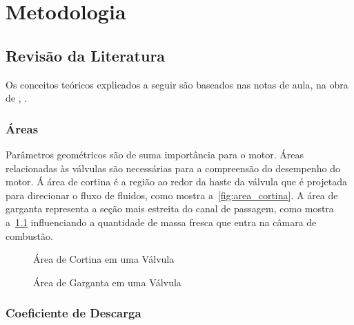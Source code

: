 \chapter{Metodologia}

\section{Revisão da Literatura}

Os conceitos teóricos explicados a seguir são baseados nas notas de aula, na obra de \textcite{heywood2018internal}, \textcite{ferguson2015internal}.

\subsection{Áreas}

Parâmetros geométricos são de suma importância para o motor. 
Áreas relacionadas às válvulas são necessárias para a compreensão do desempenho do motor.
Á área de cortina é a região ao redor da haste da válvula que é projetada para direcionar o fluxo de fluidos, como mostra a~\cref{fig:area_cortina}.
A área de garganta representa a seção mais estreita do canal de passagem, como mostra a~\cref{fig:area_garganta} influenciando a quantidade de massa fresca que entra na câmara de combustão.


\begin{figure}[!htb]
    \centering
     \begin{minipage}{0.49\textwidth}
        \centering
        \caption{Área de Cortina em uma Válvula}
        
        \label{fig:area_cortina}
     \end{minipage}
     \hfill
     \begin{minipage}{0.49\textwidth}
        \centering
        \caption{Área de Garganta em uma Válvula}
        
        \label{fig:area_garganta}
     \end{minipage}
   \end{figure}

\subsection{Coeficiente de Descarga}


